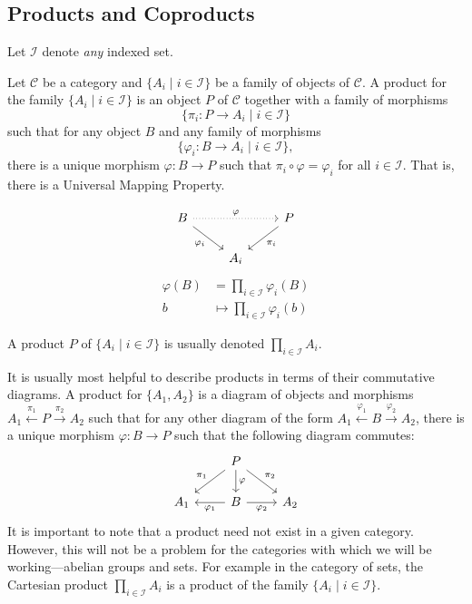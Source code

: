 \subsection{Products and Coproducts}


Let $\mathcal{I}$ denote \emph{any} indexed set.

\begin{dfn}[Product]
Let $\mathcal{C}$ be a category and $\{A_i\;|\; i \in \mathcal{I}\}$ be a family of objects of $\mathcal{C}$. A product for the family $\{A_i\;|\; i \in \mathcal{I}\}$ is an object $P$ of $\mathcal{C}$ together with a family of morphisms
	\[
	\{ \pi_i: P \rightarrow A_i \;|\; i \in \mathcal{I}\}
	\]
such that for any object $B$ and any family of morphisms
	\[
	\{ \varphi_i: B \rightarrow A_i \;|\; i \in \mathcal{I}\},
	\]
there is a unique morphism $\varphi: B \rightarrow P$ such that $\pi_i \circ \varphi=\varphi_i$ for all $i \in \mathcal{I}$. That is, there is a Universal Mapping Property. 
\begin{multicols}{2}
	\[
	\begin{tikzcd}
	B \arrow[dotted]{rr}{\varphi}
	 \arrow[swap]{dr}{\varphi_i}
	 &                & P \arrow{dl}{\pi_i} \\
	 & A_i & 
	\end{tikzcd}
	\]
	\break
	\[
	\begin{split}
	\varphi(B)&=\prod_{i \in \mathcal{I}} \varphi_i(B) \\
	b &\mapsto \prod_{i \in \mathcal{I}} \varphi_i(b)
	\end{split}
	\]
	\end{multicols}
A product $P$ of $\{A_i\;|\; i \in \mathcal{I}\}$ is usually denoted $\prod_{i \in \mathcal{I}} A_i$.
\end{dfn}


 It is usually most helpful to describe products in terms of their commutative diagrams. A product for $\{A_1,A_2\}$ is a diagram of objects and morphisms $A_1 \stackrel{\pi_1}{\longleftarrow} P \stackrel{\pi_2}{\longrightarrow} A_2$ such that for any other diagram of the form $A_1 \stackrel{\varphi_1}{\longleftarrow} B \stackrel{\varphi_2}{\longrightarrow} A_2$, there is a unique morphism $\varphi: B \to P$ such that the following diagram commutes:
	\[
	\begin{tikzcd}
	\hspace{0.1cm} & P \arrow[swap]{dl}{\pi_1} \arrow{dr}{\pi_2} \arrow{d}{\varphi} & \\
	A_1 & B \arrow{l}{\varphi_1} \arrow[swap]{r}{\varphi_2} & A_2
	\end{tikzcd}
	\]
It is important to note that a product need not exist in a given category. However, this will not be a problem for the categories with which we will be working---abelian groups and sets. For example in the category of sets, the Cartesian product $\prod_{i \in \mathcal{I}} A_i$ is a product of the family $\{A_i \;|\; i \in \mathcal{I}\}$. 


